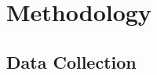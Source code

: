 \documentclass[12pt]{article}
\begin{document}
\begin{comment}
\item{Technology and Process Innovations: The operational guidelines for PMFBY advocate the use of modern technologies like drones, satellites, and geospatial mapping to 
enhance accuracy in damage assessment and claim processing. These innovations also contribute to better premium rate calculations and the identification of high-risk areas, enabling targeted interventions.}
\item{Alternative Problem Formulations: Studies have proposed alternative objectives within the PMFBY framework, such as classifying high-risk states, forecasting optimal 
premium rates, and analyzing the impact of indemnity levels on claim payouts. These approaches highlight the flexibility and potential of data-driven insights in improving scheme implementation.}
\end{itemize}
\subsection{Key Findings and Gaps}
While existing literature provides a strong foundation for understanding PMFBY's mechanisms, gaps remain in creating accessible tools for stakeholders to explore predictions 
and policy implications. Few studies have focused on integrating predictive models into interactive platforms, which could significantly enhance transparency and engagement among policymakers, insurers, and farmers.
\subsection{Relevance to Current Study}
This research aims to address these gaps by developing a predictive model for farmers' contributions to PMFBY. By leveraging historical data on crop insurance coverage and 
deploying the model through a Flask-based web application, the study seeks to provide actionable insights for subsidy optimization and equitable policy design. 
Furthermore, the use of advanced machine learning techniques and robust evaluation metrics ensures the reliability and applicability of the findings to real-world scenarios.
\end{comment}
\section{Methodology}
\subsection{Data Collection}
\end{document}
